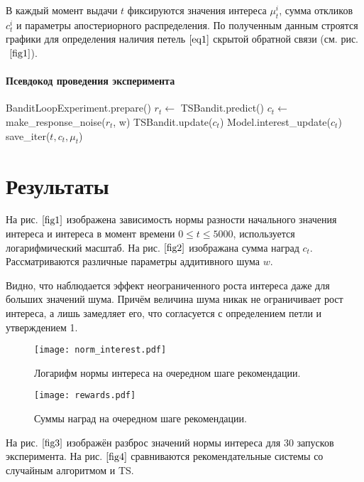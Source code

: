 \documentclass[12pt, twoside]{article}
\begin{document}
В каждый момент выдачи $t$ фиксируются значения интереса $\mu_t^i$, сумма откликов $c_t^i$ и параметры апостериорного распределения. 
По полученным данным строятся графики для определения наличия петель $\eqref{eq1}$ скрытой обратной связи (см. рис.$~\ref{fig1}$).

\paragraph{Псевдокод проведения эксперимента}
\begin{algorithmic}
  \STATE BanditLoopExperiment.prepare()
    \STATE $r_t \leftarrow$ TSBandit.predict()
    \STATE $c_t \leftarrow$ make\_response\_noise($r_t$, w)
    \STATE TSBandit.update($c_t$)
    \STATE Model.interest\_update($c_t$)
    \STATE save\_iter($t, c_t, \mu_t$)
  \ENDFOR
\end{algorithmic}

\section{Результаты}
На рис.$~\ref{fig1}$ изображена зависимость нормы разности начального значения интереса и интереса в момент времени $0 \leq t \leq 5000$, используется логарифмический масштаб. 
На рис.$~\ref{fig2}$ изображана сумма наград $c_t$.
Рассматриваются различные параметры аддитивного шума $w$.

Видно, что наблюдается эффект неограниченного роста интереса даже для больших значений шума. 
Причём величина шума никак не ограничивает рост интереса, а лишь замедляет его, что согласуется с определением петли и утверждением 1. 


\begin{figure}[h]
  \begin{multicols}{2}
    \hfill
    \texttt{[image: norm\_interest.pdf]}
    \hfill
    \caption{Логарифм нормы интереса на очередном шаге рекомендации.}
    \label{fig1}
    \hfill
    \texttt{[image: rewards.pdf]}
    \hfill
    \caption{Суммы наград на очередном шаге рекомендации.}
    \label{fig2}
  \end{multicols}
\end{figure}


На рис.$~\ref{fig3}$ изображён разброс значений нормы интереса для 30 запусков эксперимента.
На рис.$~\ref{fig4}$ сравниваются рекомендательные системы со случайным алгоритмом и TS.
\end{document}
